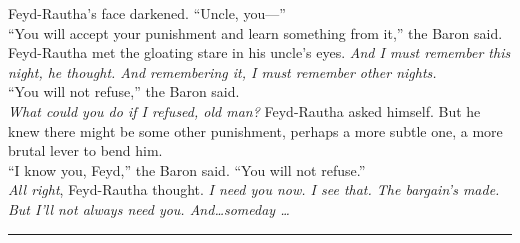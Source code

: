 \documentclass[12pt,letterpaper,draft]{memoir}
\begin{document}
Feyd-Rautha’s face darkened. “Uncle, you—”\\
“You will accept your punishment and learn something from it,” the Baron said.\\
Feyd-Rautha met the gloating stare in his uncle’s eyes. \textit{And I must remember this night, he thought. And remembering it, I must remember other nights.}\\
“You will not refuse,” the Baron said.\\
\textit{What could you do if I refused, old man?} Feyd-Rautha asked himself. But he knew there might be some other punishment, perhaps a more subtle one, a more brutal lever to bend him.\\
“I know you, Feyd,” the Baron said. “You will not refuse.”\\
\textit{All right}, Feyd-Rautha thought. \textit{I need you now. I see that. The bargain’s made. But I’ll not always need you. And\ldots someday \ldots} 
\fancybreak{{*}\\{* * *}\\{*}}
\end{document}
